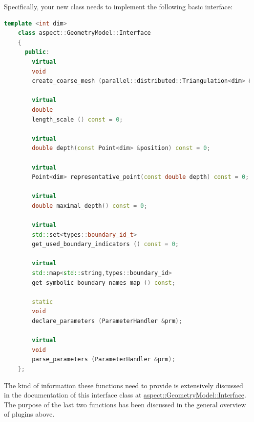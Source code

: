 \documentclass{article}
\begin{document}
Specifically, your new class needs to implement the following basic interface:
\begin{lstlisting}[frame=single,language=C++]
    template <int dim>
    class aspect::GeometryModel::Interface
    {
      public:
        virtual
        void
        create_coarse_mesh (parallel::distributed::Triangulation<dim> &coarse_grid) const = 0;

        virtual
        double
        length_scale () const = 0;

        virtual
        double depth(const Point<dim> &position) const = 0;

        virtual
        Point<dim> representative_point(const double depth) const = 0;

        virtual
        double maximal_depth() const = 0;

        virtual
        std::set<types::boundary_id_t>
        get_used_boundary_indicators () const = 0;

        virtual
        std::map<std::string,types::boundary_id>
        get_symbolic_boundary_names_map () const;

        static
        void
        declare_parameters (ParameterHandler &prm);

        virtual
        void
        parse_parameters (ParameterHandler &prm);
    };
\end{lstlisting}
The kind of information these functions need to provide is extensively
discussed in the documentation of this interface class at
\href{doc/doxygen/classaspect_1_1GeometryModel_1_1Interface.html}{aspect::GeometryModel::Interface}.
The purpose of the last two functions has been discussed in the general
overview of plugins above.
\end{document}
